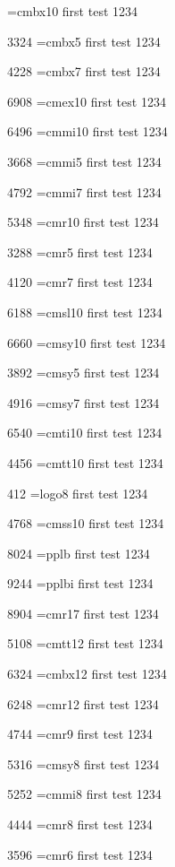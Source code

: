 \font\tstfont=cmbx10 first test 1234 

3324	\tstfont \font\tstfont=cmbx5 first test 1234 

4228	\tstfont \font\tstfont=cmbx7 first test 1234 

6908	\tstfont \font\tstfont=cmex10 first test 1234 

6496	\tstfont \font\tstfont=cmmi10 first test 1234 

3668	\tstfont \font\tstfont=cmmi5 first test 1234 

4792	\tstfont \font\tstfont=cmmi7 first test 1234 

5348	\tstfont \font\tstfont=cmr10 first test 1234 

3288	\tstfont \font\tstfont=cmr5 first test 1234 

4120	\tstfont \font\tstfont=cmr7 first test 1234 

6188	\tstfont \font\tstfont=cmsl10 first test 1234 

6660	\tstfont \font\tstfont=cmsy10 first test 1234 

3892	\tstfont \font\tstfont=cmsy5 first test 1234 

4916	\tstfont \font\tstfont=cmsy7 first test 1234 

6540	\tstfont \font\tstfont=cmti10 first test 1234 

4456	\tstfont \font\tstfont=cmtt10 first test 1234 

412	\tstfont \font\tstfont=logo8 first test 1234 

4768	\tstfont \font\tstfont=cmss10 first test 1234 

8024	\tstfont \font\tstfont=pplb first test 1234 

9244	\tstfont \font\tstfont=pplbi first test 1234 

8904	\tstfont \font\tstfont=cmr17 first test 1234 

5108	\tstfont \font\tstfont=cmtt12 first test 1234 

6324	\tstfont \font\tstfont=cmbx12 first test 1234 

6248	\tstfont \font\tstfont=cmr12 first test 1234 

4744	\tstfont \font\tstfont=cmr9 first test 1234 

5316	\tstfont \font\tstfont=cmsy8 first test 1234 

5252	\tstfont \font\tstfont=cmmi8 first test 1234 

4444	\tstfont \font\tstfont=cmr8 first test 1234 

3596	\tstfont \font\tstfont=cmr6 first test 1234 

